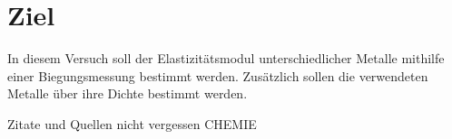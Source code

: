 \section{Ziel}

In diesem Versuch soll der Elastizitätsmodul unterschiedlicher Metalle mithilfe 
einer Biegungsmessung bestimmt werden. Zusätzlich sollen die verwendeten Metalle 
über ihre Dichte bestimmt werden.


Zitate und Quellen nicht vergessen
CHEMIE
